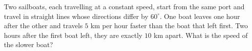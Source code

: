 Two sailboats, each travelling at a constant speed, start from the same port and travel in straight lines whose directions differ by $60^\circ$. One boat leaves one hour after the other and travels $5$ km per hour faster than the boat that left first. Two hours after the first boat left, they are exactly $10$ km apart. What is the speed of the slower boat?
